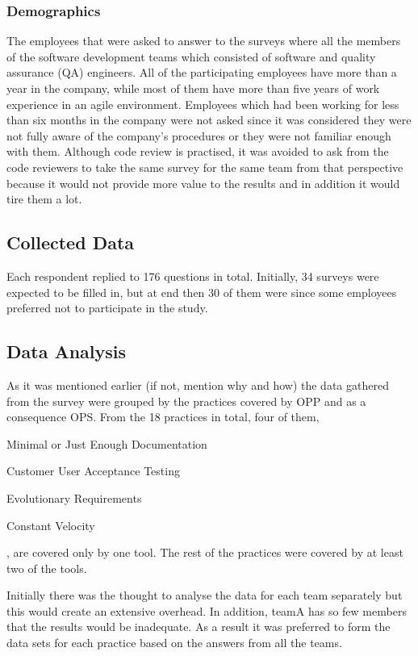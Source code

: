 \subsubsection{Demographics} %
The employees that were asked to answer to the surveys where all the members of the software development teams which consisted of software and quality assurance (QA) engineers. All of the participating employees have more than a year in the company, while most of them have more than five years of work experience in an agile environment. Employees which had been working for less than six months in the company were not asked since it was considered they were not fully aware of the company's procedures or they were not familiar enough with them. Although code review is practised, it was avoided to ask from the code reviewers to take the same survey for the same team from that perspective because it would not provide more value to the results and in addition it would tire them a lot.

\subsection{Collected Data}
Each respondent replied to 176 questions in total. Initially, 34 surveys were expected to be filled in, but at end then 30 of them were since some employees preferred not to participate in the study.

\subsection{Data Analysis}
As it was mentioned earlier (if not, mention why and how) the data gathered from the survey were grouped by the practices covered by OPP and as a consequence OPS. From the 18 practices in total, four of them, \begin{inparaenum} [a\upshape)] \item Minimal or Just Enough Documentation \item Customer User Acceptance Testing \item Evolutionary Requirements \item Constant Velocity \end{inparaenum}, are covered only by one tool. The rest of the practices were covered by at least two of the tools.

Initially there was the thought to analyse the data for each team separately but this would create an extensive overhead. In addition, teamA has so few members that the results would be inadequate. As a result it was preferred to form the data sets for each practice based on the answers from all the teams.

